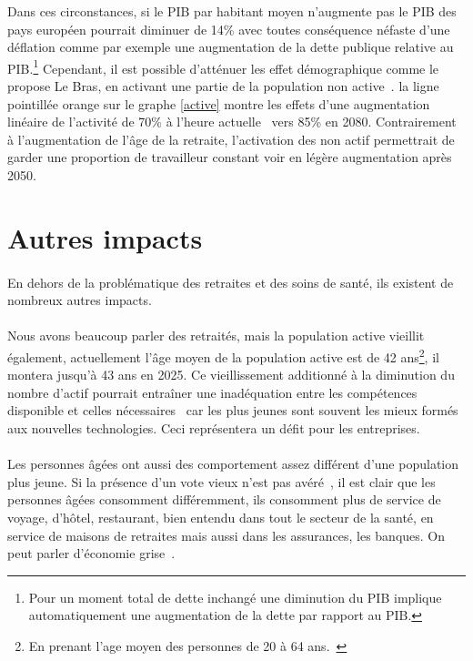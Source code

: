 Dans ces circonstances, si le PIB par habitant moyen n’augmente pas le PIB des pays européen pourrait diminuer de 14\% avec toutes conséquence néfaste d’une déflation comme par exemple une augmentation de la dette publique relative au PIB.\footnote{Pour un moment total de dette inchangé une diminution du PIB implique automatiquement une augmentation de la dette par rapport au PIB.} Cependant, il est possible d’atténuer les effet démographique comme le propose Le Bras, en activant une partie de la population non active~\citep[pp.36]{heran}. la ligne pointillée orange sur le graphe \ref{active} montre les effets d’une augmentation linéaire de l’activité de 70\% à l’heure actuelle~\citep{eurostat_emploi} vers 85\% en 2080. Contrairement à l’augmentation de l’âge de la retraite, l’activation des non actif permettrait de garder une proportion de travailleur constant voir en légère augmentation après 2050. 

\section{Autres impacts}
\paragraph{}En dehors de la problématique des retraites et des soins de santé, ils existent de nombreux autres impacts. 

\paragraph{}Nous avons beaucoup parler des retraités, mais la population active vieillit également, actuellement l’âge moyen de la population active est de 42 ans\footnote{ En prenant l’age moyen des personnes de 20 à 64 ans.~\citep{eurostat_europop13}}, il montera jusqu’à 43 ans en 2025. Ce vieillissement additionné à la diminution du nombre d’actif pourrait entraîner une inadéquation entre les compétences disponible et celles nécessaires~\citep[pp.10]{thesis} car les plus jeunes sont souvent les mieux formés aux nouvelles technologies. Ceci représentera un défit pour les entreprises. 

\paragraph{}Les personnes âgées ont aussi des comportement assez différent d’une population plus jeune. Si la présence d’un vote vieux n’est pas avéré~\citep[pp.10]{heran}, il est clair que les personnes âgées consomment différemment, ils consomment plus de service de voyage, d’hôtel, restaurant, bien entendu dans tout le secteur de la santé,  en service de maisons de retraites mais aussi dans les assurances, les banques. On peut parler d’économie grise~\citep[pp.11]{thesis}. 

